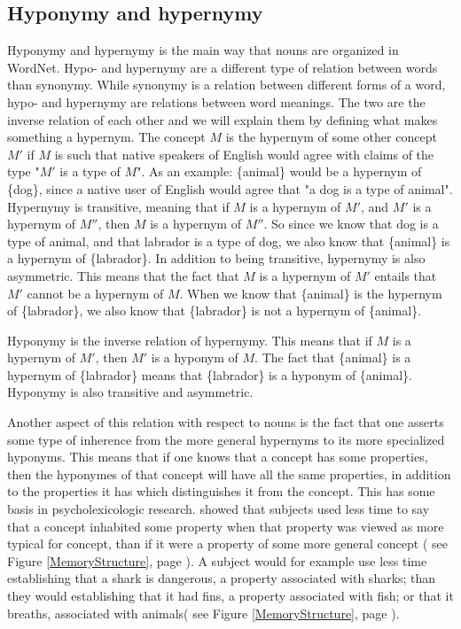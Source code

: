 \subsection{Hyponymy and hypernymy}
Hyponymy and hypernymy is the main way that nouns are organized in WordNet.
Hypo- and hypernymy are a different type of relation between words than synonymy.
While synonymy is a relation between different forms of a word, 
hypo- and hypernymy are relations between word meanings.
The two are the inverse relation of each other and we will explain them by defining what makes something a hypernym.
The concept $M$ is the hypernym of some other concept $M'$ if $M$ is such that native speakers of English would agree
with claims of the type "$M'$ is a type of $M$". 
As an example: \{animal\} would be a hypernym of \{dog\}, 
since a native user of English would agree that "a dog is a type of animal".
Hypernymy is transitive, meaning that if $M$ is a hypernym of $M'$, and $M'$ is a hypernym of $M''$, 
then $M$ is a hypernym of $M''$.
So since we know that dog is a type of animal, and that labrador is a type of dog, 
we also know that \{animal\} is a hypernym of \{labrador\}.
In addition to being transitive, hypernymy is also asymmetric.
This means that the fact that $M$ is a hypernym of $M'$ entails that $M'$ cannot be a hypernym of $M$.
When we know that \{animal\} is the hypernym of \{labrador\}, 
we also know that \{labrador\} is not a hypernym of \{animal\}\citep{Miller1990}.

Hyponymy is the inverse relation of hypernymy. 
This means that if $M$ is a hypernym of $M'$, then $M'$ is a hyponym of $M$. 
The fact that \{animal\} is a hypernym of \{labrador\} means that \{labrador\} is a hyponym of \{animal\}.
Hyponymy is also transitive and asymmetric\citep{Miller1990}.

Another aspect of this relation with respect to nouns is the fact that one asserts some type of inherence from the more
general hypernyms to its more specialized hyponyms. 
This means that if one knows that a concept has some properties, 
then the hyponymes of that concept will have all the same properties, 
in addition to the properties it has which distinguishes it from the concept\citep{Miller1990a}.
This has some basis in psycholexicologic research. 
\citet{Collins1969} showed that subjects used less time to say that a concept inhabited some property when that property
was viewed as more typical for concept, than if it were a property of some more general concept
( see Figure \ref{MemoryStructure}, page \pageref{MemoryStructure}).
A subject would for example use less time establishing that a shark is dangerous, a property associated with sharks;
than they would establishing that it had fins, a property associated with fish; or that it breaths, associated with animals( see Figure \ref{MemoryStructure}, page \pageref{MemoryStructure}).

